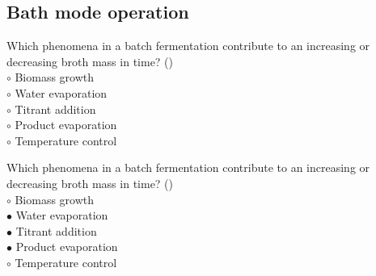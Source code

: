 \documentclass[]{beamer}
\begin{document}
\subsection{Bath mode operation}
\setcounter{questions}{0}
\setcounter{answers}{0}
\begin{frame}[shrink] {}
\addtocounter{questions}{1}
\color{blue}
Which phenomena in a batch fermentation contribute to an increasing or decreasing broth mass in time? ()\\
\color{black}
\setlength{\parindent}{-0.4cm}
{\color{red}$\circ$}  Biomass growth \\
{\color{red}$\circ$} Water evaporation \\
{\color{red}$\circ$} Titrant addition \\
{\color{red}$\circ$} Product evaporation \\
{\color{red}$\circ$} Temperature control  \\
\end{frame}
\begin{frame}[shrink] {}
\addtocounter{answers}{1}
\color{blue}
Which phenomena in a batch fermentation contribute to an increasing or decreasing broth mass in time? ()\\
\color{black}
\setlength{\parindent}{-0.4cm}
{\color{red}$\circ$}  Biomass growth \\
{\color{red}$\bullet$} Water evaporation \\
{\color{red}$\bullet$} Titrant addition \\
{\color{red}$\bullet$} Product evaporation \\
{\color{red}$\circ$} Temperature control  \\
\end{frame}
\end{document}
